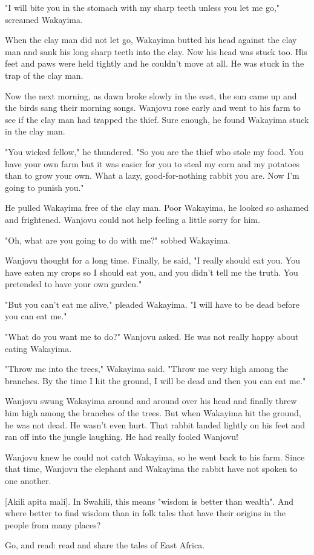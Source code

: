 "I will bite you in the stomach with my sharp teeth unless you let me go," screamed Wakayima.

When the clay man did not let go, Wakayima butted his head against the clay man and sank his long sharp teeth into the clay. Now his head was stuck too. His feet and paws were held tightly and he couldn't move at all. He was stuck in the trap of the clay man.

Now the next morning, as dawn broke slowly in the east, the sun came up and the birds sang their morning songs. Wanjovu rose early and went to his farm to see if the clay man had trapped the thief. Sure enough, he found Wakayima stuck in the clay man.

"You wicked fellow," he thundered. "So you are the thief who stole my food. You have your own farm but it was easier for you to steal my corn and my potatoes than to grow your own. What a lazy, good-for-nothing rabbit you are. Now I'm going to punish you."

He pulled Wakayima free of the clay man. Poor Wakayima, he looked so ashamed and frightened. Wanjovu could not help feeling a little sorry for him.

"Oh, what are you going to do with me?" sobbed Wakayima.

Wanjovu thought for a long time. Finally, he said, "I really should eat you. You have eaten my crops so I should eat you, and you didn't tell me the truth. You pretended to have your own garden."

"But you can't eat me alive," pleaded Wakayima. "I will have to be dead before you can eat me."

"What do you want me to do?" Wanjovu asked. He was not really happy about eating Wakayima.

"Throw me into the trees," Wakayima said. "Throw me very high among the branches. By the time I hit the ground, I will be dead and then you can eat me."

Wanjovu swung Wakayima around and around over his head and finally threw him high among the branches of the trees. But when Wakayima hit the ground, he was not dead. He wasn't even hurt. That rabbit landed lightly on his feet and ran off into the jungle laughing. He had really fooled Wanjovu!

Wanjovu knew he could not catch Wakayima, so he went back to his farm. Since that time, Wanjovu the elephant and Wakayima the rabbit have not spoken to one another.

    [Akili apita mali]. In Swahili, this means "wisdom is better than wealth". And where better to find wisdom than in folk tales that have their origins in the people from many places?

Go, and read: read and share the tales of East Africa.

\clearpage
\newpage